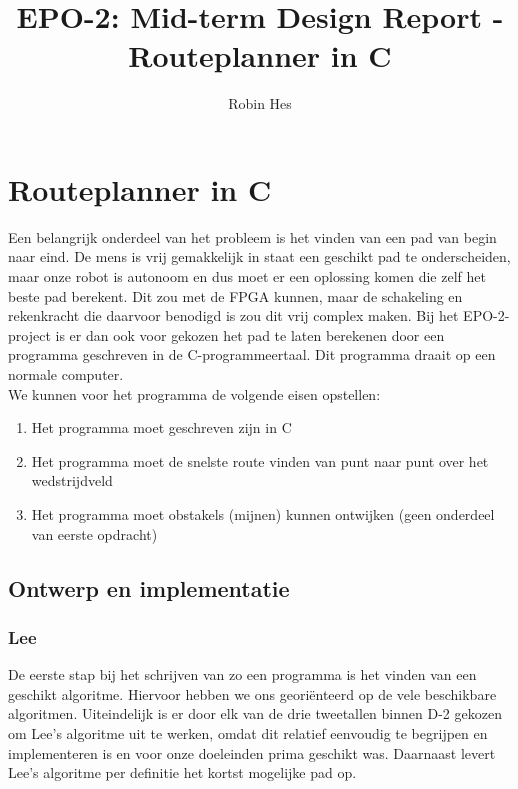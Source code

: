 \documentclass{report}
\title{EPO-2: Mid-term Design Report - Routeplanner in C}
\author{Robin Hes}
\begin{document}
\chapter{Routeplanner in C}
\label{ch:route}

Een belangrijk onderdeel van het probleem is het vinden van een pad van begin naar eind. De mens is vrij gemakkelijk in staat een geschikt pad te onderscheiden, maar onze robot is autonoom en dus moet er een oplossing komen die zelf het beste pad berekent. Dit zou met de FPGA kunnen, maar de schakeling en rekenkracht die daarvoor benodigd is zou dit vrij complex maken. Bij het EPO-2-project is er dan ook voor gekozen het pad te laten berekenen door een programma geschreven in de C-programmeertaal. Dit programma draait op een normale computer. \\

\noindent
We kunnen voor het programma de volgende eisen opstellen:

\begin{enumerate}
	\item Het programma moet geschreven zijn in C
	\item Het programma moet de snelste route vinden van punt naar punt over het wedstrijdveld
	\item Het programma moet obstakels (mijnen) kunnen ontwijken (geen onderdeel van eerste opdracht)
\end{enumerate}

\section{Ontwerp en implementatie}
\label{sec:ontwerp-impl}

\subsection{Lee}
\label{ssec:lee}

De eerste stap bij het schrijven van zo een programma is het vinden van een geschikt algoritme. Hiervoor hebben we ons georiënteerd op de vele beschikbare algoritmen. Uiteindelijk is er door elk van de drie tweetallen binnen D-2 gekozen om Lee's algoritme uit te werken, omdat dit relatief eenvoudig te begrijpen en implementeren is en voor onze doeleinden prima geschikt was. Daarnaast levert Lee's algoritme per definitie het kortst mogelijke pad op. 
\end{document}
